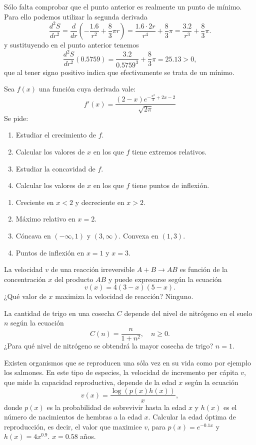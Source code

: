 {Sólo falta comprobar que el punto anterior es realmente un punto de mínimo. Para ello podemos utilizar la segunda derivada
\[
\frac{d^2S}{dr^2} = \frac{d}{dr}\left(-\frac{1.6}{r^2}+\frac{8}{3}\pi r\right) = \frac{1.6\cdot 2r}{r^4}+\frac{8}{3}\pi = \frac{3.2}{r^3}+\frac{8}{3}\pi. 
\]
y sustituyendo en el punto anterior tenemos
\[
\frac{d^2S}{dr^2}(0.5759) =  \frac{3.2}{0.5759^3}+\frac{8}{3}\pi = 25.13 >0,
\]
que al tener signo positivo indica que efectivamente se trata de un mínimo.
}

{Sea $f(x)$ una función cuya derivada vale:
\[
f'(x) = \frac{(2-x) e^{-\frac{x^2}{2}+2x-2}}{\sqrt{2\pi}}
\]
Se pide:
\begin{enumerate}
\item Estudiar el crecimiento de $f$.
\item Calcular los valores de $x$ en los que $f$ tiene extremos relativos.
\item Estudiar la concavidad de $f$.
\item Calcular los valores de $x$ en los que $f$ tiene puntos de inflexión.
\end{enumerate}
}
{\begin{enumerate}
\item Creciente en $x<2$ y decreciente en $x>2$.
\item Máximo relativo en $x=2$.
\item Cóncava en $(-\infty,1)$ y $(3,\infty)$. Convexa en $(1,3)$.
\item Puntos de inflexión en $x=1$ y $x=3$.
\end{enumerate}
}
{
}


{La velocidad $v$ de una reacción irreversible $A+B\rightarrow AB$ es función de la concentración $x$ del producto $AB$ y puede expresarse según la ecuación
\[
v(x) = 4(3-x)(5-x).
\]
¿Qué valor de $x$ maximiza la velocidad de reacción?
}
{Ninguno.
}
{
}


{La cantidad de trigo en una cosecha $C$ depende del nivel de nitrógeno en el suelo $n$ según la ecuación
\[
C(n) = \frac{n}{1+n^2},\quad n\geq 0. 
\]
¿Para qué nivel de nitrógeno se obtendrá la mayor cosecha de trigo?
}
{$n=1$.
}
{
}


{Existen organismos que se reproducen una sóla vez en su vida como por ejemplo los salmones. 
En este tipo de especies, la velocidad de incremento per cápita $v$, que mide la capacidad reproductiva, depende de la edad $x$ según la ecuación
\[
v(x) = \frac{\log(p(x)h(x))}{x},
\] 
donde $p(x)$ es la probabilidad de sobrevivir hasta la edad $x$ y $h(x)$ es el número de nacimientos de hembras a la edad $x$. 
Calcular la edad óptima de reproducción, es decir, el valor que maximice $v$, para $p(x)=e^{-0.1x}$ y $h(x)=4x^{0.9}$.}
{$x=0.58$ años.
}
{
}


